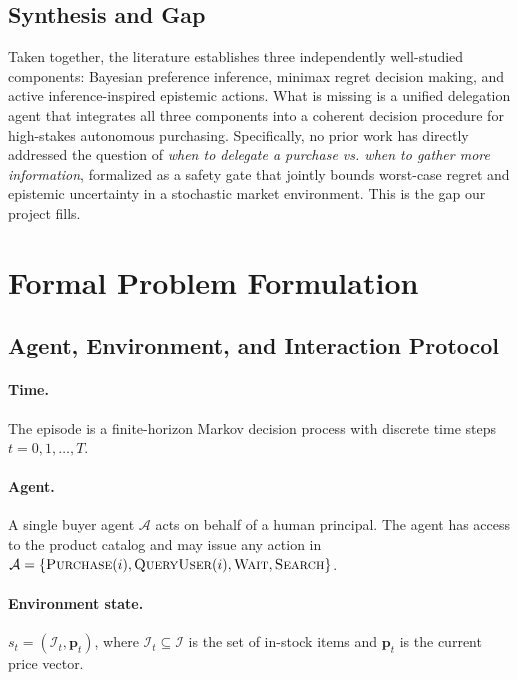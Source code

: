 \documentclass[11pt,letterpaper]{article}
\newcommand{\Purchase}{\textsc{Purchase}}
\newcommand{\QueryUser}{\textsc{QueryUser}}
\newcommand{\Wait}{\textsc{Wait}}
\newcommand{\Search}{\textsc{Search}}
\begin{document}
\subsection{Synthesis and Gap}

Taken together, the literature establishes three independently well-studied components: Bayesian preference inference, minimax regret decision making, and active inference-inspired epistemic actions.  What is missing is a unified delegation agent that integrates all three components into a coherent decision procedure for high-stakes autonomous purchasing.  Specifically, no prior work has directly addressed the question of \emph{when to delegate a purchase vs. when to gather more information}, formalized as a safety gate that jointly bounds worst-case regret and epistemic uncertainty in a stochastic market environment.  This is the gap our project fills.

\section{Formal Problem Formulation}
\label{sec:formulation}

\subsection{Agent, Environment, and Interaction Protocol}

\paragraph{Time.} The episode is a finite-horizon Markov decision process with discrete time steps $t = 0, 1, \dots, T$.

\paragraph{Agent.} A single buyer agent $\mathcal{A}$ acts on behalf of a human principal.  The agent has access to the product catalog and may issue any action in $\mathcal{A} = \{\Purchase(i), \QueryUser(i), \Wait, \Search\}$.

\paragraph{Environment state.} $s_t = (\mathcal{I}_t, \mathbf{p}_t)$, where $\mathcal{I}_t \subseteq \mathcal{I}$ is the set of in-stock items and $\mathbf{p}_t$ is the current price vector.
\end{document}

